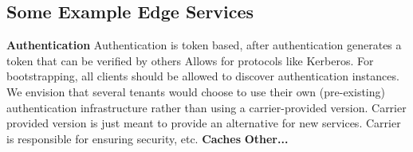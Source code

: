 {\subsection{Some Example Edge Services}
\begin{outline}
\1 \textbf{Authentication}
    \2 Authentication is token based, \ie after authentication generates a token that can be verified by others
        \3 Allows for protocols like Kerberos.
    \2 For bootstrapping, all clients should be allowed to discover authentication instances.
    \2 We envision that several tenants would choose to use their own (pre-existing) authentication infrastructure rather than using a carrier-provided 
       version.
        \3 Carrier provided version is just meant to provide an alternative for new services.
        \3 Carrier is responsible for ensuring security, etc.
\1 \textbf{Caches}
\1 \textbf{Other...}
\end{outline}
}